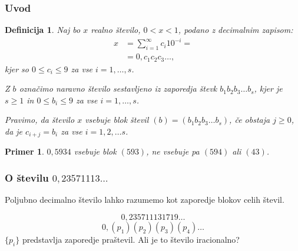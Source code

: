 \documentclass{beamer}
\newtheorem{definicija}{Definicija}
\newtheorem{primer}{Primer}
\begin{document}
\begin{frame}
    \frametitle{Uvod}
    \begin{definicija}
        Naj bo $x$ realno število, $ 0 < x < 1$, podano z decimalnim zapisom: 
        \[ 
            \begin{split}
                x & = \sum^{\infty}_{i=1} c_i 10^{-i} = \\
                & = 0,c_1c_2c_3 \ldots ,
            \end{split}   
        \]
        kjer so $0 \leq c_i \leq 9$ za vse $ i = 1, \ldots, s$.
        
        Z $b$ označimo naravno število sestavljeno iz zaporedja števk
        $b_1b_2b_3 \ldots b_s$, 
        kjer je $s\geq 1$ in $0 \leq b_i \leq 9$ za vse $i = 1, \ldots, s$.

        Pravimo, da število $x$ \alert{vsebuje blok števil} $(b) = (b_1b_2b_3 \dots b_s)$, če obstaja $j \geq 0$, da je 
        $c_{i+j} = b_i$ za vse $i=1, 2, \ldots s$. 
    \end{definicija}


    \pause
    \begin{primer}
        $0,5934$ vsebuje blok $(593)$, ne vsebuje pa $(594)$ ali $(43)$.
    \end{primer} 


\end{frame}

\begin{frame}
    \frametitle{O številu $0,23571113\ldots$}
    Poljubno decimalno število lahko razumemo kot zaporedje blokov celih števil.

    \pause
    \[0,235711131719\ldots\]
    \pause
    \[0,(p_1)(p_2)(p_3)(p_4)\ldots\]
    $\{p_i\}$ predstavlja zaporedje praštevil.
    \pause
    \newline
    \newline
    Ali je to število iracionalno?


\end{frame}
\end{document}
